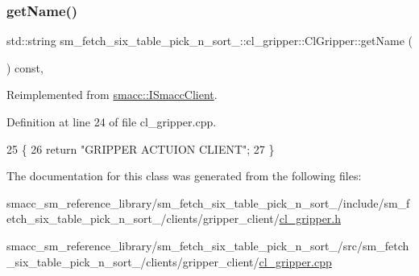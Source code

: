 \subsubsection{\texorpdfstring{get\+Name()}{getName()}}
{\footnotesize\ttfamily std\+::string sm\+\_\+fetch\+\_\+six\+\_\+table\+\_\+pick\+\_\+n\+\_\+sort\+\_\+::cl\+\_\+gripper\+::\+Cl\+Gripper\+::get\+Name (\begin{DoxyParamCaption}{ }\end{DoxyParamCaption}) const\hspace{0.3cm}{\ttfamily [override]}, {\ttfamily [virtual]}}



Reimplemented from \hyperlink{classsmacc_1_1ISmaccClient_a8c3ce19f182e71909c5dc6263d25be69}{smacc\+::\+I\+Smacc\+Client}.



Definition at line 24 of file cl\+\_\+gripper.\+cpp.


\begin{DoxyCode}
25 \{
26     \textcolor{keywordflow}{return} \textcolor{stringliteral}{"GRIPPER ACTUION CLIENT"};
27 \}
\end{DoxyCode}


The documentation for this class was generated from the following files\+:\begin{DoxyCompactItemize}
\item 
smacc\+\_\+sm\+\_\+reference\+\_\+library/sm\+\_\+fetch\+\_\+six\+\_\+table\+\_\+pick\+\_\+n\+\_\+sort\+\_/include/sm\+\_\+fetch\+\_\+six\+\_\+table\+\_\+pick\+\_\+n\+\_\+sort\+\_/clients/gripper\+\_\+client/\hyperlink{sm__fetch__six__table__pick__n__sort__1_2include_2sm__fetch__six__table__pick__n__sort__1_2clienf1b29855fe4f6938a9d6a5ca1e0b8e9a}{cl\+\_\+gripper.\+h}\item 
smacc\+\_\+sm\+\_\+reference\+\_\+library/sm\+\_\+fetch\+\_\+six\+\_\+table\+\_\+pick\+\_\+n\+\_\+sort\+\_/src/sm\+\_\+fetch\+\_\+six\+\_\+table\+\_\+pick\+\_\+n\+\_\+sort\+\_/clients/gripper\+\_\+client/\hyperlink{sm__fetch__six__table__pick__n__sort__1_2src_2sm__fetch__six__table__pick__n__sort__1_2clients_212c5a3e7bad7719e49757743932d2255}{cl\+\_\+gripper.\+cpp}\end{DoxyCompactItemize}
